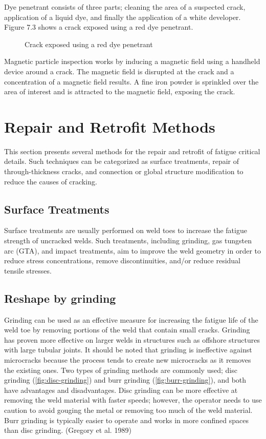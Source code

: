 Dye penetrant consists of three parts; cleaning the area of a suspected crack, application of a liquid dye, and
finally the application of a white developer. Figure 7.3 shows a crack exposed using a red dye penetrant.

\begin{figure}
  \caption{Crack exposed using a red dye penetrant}
  \label{fig:crack-exposed}
\end{figure}

Magnetic particle inspection works by inducing a magnetic field using a handheld device around a crack. The
magnetic field is disrupted at the crack and a concentration of a magnetic field results. A fine iron powder is
sprinkled over the area of interest and is attracted to the magnetic field, exposing the crack.

\section{Repair and Retrofit Methods}
This section presents several methods for the repair and retrofit of fatigue critical details. Such techniques can be
categorized as surface treatments, repair of through-thickness cracks, and connection or global structure modification
to reduce the causes of cracking.

\subsection{Surface Treatments}
Surface treatments are usually performed on weld toes to increase the fatigue strength of uncracked welds. Such
treatments, including grinding, gas tungsten arc (GTA), and impact treatments, aim to improve the weld geometry in
order to reduce stress concentrations, remove discontinuities, and/or reduce residual tensile stresses.

\subsection{Reshape by grinding}
Grinding can be used as an effective measure for increasing the fatigue life of the weld toe by removing portions
of the weld that contain small cracks. Grinding has proven more effective on larger welds in structures such as
offshore structures with large tubular joints. It should be noted that grinding is ineffective against microcracks
because the process tends to create new microcracks as it removes the existing ones. Two types of grinding methods
are commonly used; disc grinding (\cref{fig:disc-grinding}) and burr grinding (\cref{fig:burr-grinding}), and both have advantages and
disadvantages. Disc grinding can be more effective at removing the weld material with faster speeds; however, the
operator needs to use caution to avoid gouging the metal or removing too much of the weld material. Burr grinding is
typically easier to operate and works in more confined spaces than disc grinding. (Gregory et al. 1989)

